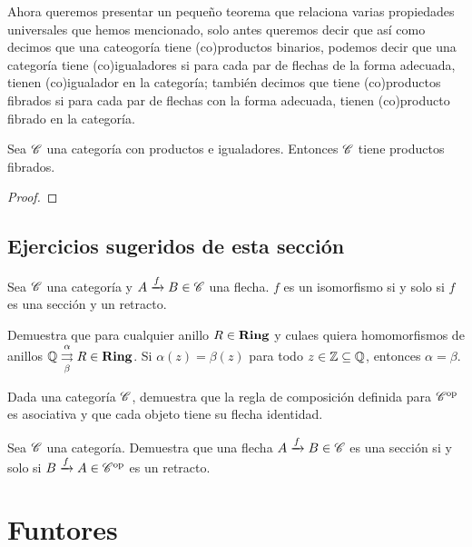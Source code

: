 \documentclass{comunicaciones}
\begin{document}
Ahora queremos presentar un pequeño teorema que relaciona varias propiedades universales que hemos mencionado, solo antes queremos decir que así como decimos
que una cateogoría tiene (co)productos binarios, podemos decir que una categoría tiene (co)igualadores si para cada par de flechas de la forma adecuada,
tienen (co)igualador en la categoría; también decimos que tiene (co)productos fibrados si para cada par de flechas con la forma adecuada, tienen (co)producto
fibrado en la categoría.

\begin{thm}
    Sea $\mathscr C$ una categoría con productos e igualadores. Entonces $\mathscr C$ tiene productos fibrados.
\end{thm}
\begin{proof}

\end{proof}


\subsection{Ejercicios sugeridos de esta sección}
\begin{ex}
    Sea $\mathscr C$ una categoría y $A\xrightarrow{f}B\in\mathscr C$ una flecha. $f$ es un isomorfismo si y solo si $f$ es una sección y un retracto.
\end{ex}

\begin{ex}
    Demuestra que para cualquier anillo $R\in\mathbf{Ring}$ y culaes quiera homomorfismos de anillos $\mathbb Q\overset{\alpha}{\underset{\beta}{\rightrightarrows}}R\in\mathbf{Ring}$. Si $\alpha(z)=\beta(z)$ para todo $z\in\mathbb Z\subseteq\mathbb Q$, 
    entonces $\alpha=\beta$.
\end{ex}

\begin{ex}
    Dada una categoría $\mathscr C$, demuestra que la regla de composición definida para $\mathscr C^{\mathrm{op}}$ es asociativa y que cada objeto tiene su flecha identidad.
\end{ex}

\begin{ex}
    Sea $\mathscr C$ una categoría. Demuestra que una flecha $A\xrightarrow{f}B\in\mathscr C$ es una sección si y solo si $B\xrightarrow{f}A\in\mathscr C^{\mathrm{op}}$ es un retracto.
\end{ex}

\section{Funtores}
\end{document}
